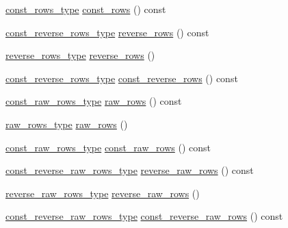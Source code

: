 \begin{DoxyCompactItemize}
\item 
\hyperlink{classIceBRG_1_1labeled__array_a6aec05e454845b2750b446c00fd4c9fb}{const\+\_\+rows\+\_\+type} \hyperlink{classIceBRG_1_1labeled__array_a459e93ba49dd55743341faf01a885668}{const\+\_\+rows} () const 
\item 
\hyperlink{classIceBRG_1_1labeled__array_a4d8f245def66ea4352beb6299a657bfb}{const\+\_\+reverse\+\_\+rows\+\_\+type} \hyperlink{classIceBRG_1_1labeled__array_acc985e5e4129c16f8bedea72a82c6812}{reverse\+\_\+rows} () const 
\item 
\hyperlink{classIceBRG_1_1labeled__array_a24ccb02827e9be94dadbcf647c663b03}{reverse\+\_\+rows\+\_\+type} \hyperlink{classIceBRG_1_1labeled__array_aae7fb0f5a753948803e0a415d6b9fff2}{reverse\+\_\+rows} ()
\item 
\hyperlink{classIceBRG_1_1labeled__array_a4d8f245def66ea4352beb6299a657bfb}{const\+\_\+reverse\+\_\+rows\+\_\+type} \hyperlink{classIceBRG_1_1labeled__array_a789eeeaa20e277ea9d7ff9bfa481c2d4}{const\+\_\+reverse\+\_\+rows} () const 
\item 
\hyperlink{classIceBRG_1_1labeled__array_adecd8b6c6343a2618a1c47c6f15b9ea2}{const\+\_\+raw\+\_\+rows\+\_\+type} \hyperlink{classIceBRG_1_1labeled__array_a6a5bd5901e73694377b61173c6319648}{raw\+\_\+rows} () const 
\item 
\hyperlink{classIceBRG_1_1labeled__array_a87c569635102ad3390845861bc9cf5cc}{raw\+\_\+rows\+\_\+type} \hyperlink{classIceBRG_1_1labeled__array_a54c0925eff34445ac862bc54c90b5875}{raw\+\_\+rows} ()
\item 
\hyperlink{classIceBRG_1_1labeled__array_adecd8b6c6343a2618a1c47c6f15b9ea2}{const\+\_\+raw\+\_\+rows\+\_\+type} \hyperlink{classIceBRG_1_1labeled__array_abded3481bcef303ae5f58aa075c2dcb8}{const\+\_\+raw\+\_\+rows} () const 
\item 
\hyperlink{classIceBRG_1_1labeled__array_a83872d8babf4f2e0db65776cac90aa38}{const\+\_\+reverse\+\_\+raw\+\_\+rows\+\_\+type} \hyperlink{classIceBRG_1_1labeled__array_a07c933d209f4a5a3a212efb971d06e6e}{reverse\+\_\+raw\+\_\+rows} () const 
\item 
\hyperlink{classIceBRG_1_1labeled__array_ae4ef7537f1bfb799048e17588ccd2be0}{reverse\+\_\+raw\+\_\+rows\+\_\+type} \hyperlink{classIceBRG_1_1labeled__array_ad7d8871cdff75a82004c955c24f99862}{reverse\+\_\+raw\+\_\+rows} ()
\item 
\hyperlink{classIceBRG_1_1labeled__array_a83872d8babf4f2e0db65776cac90aa38}{const\+\_\+reverse\+\_\+raw\+\_\+rows\+\_\+type} \hyperlink{classIceBRG_1_1labeled__array_a0431c9effba88adf9dd5af9f7767c89f}{const\+\_\+reverse\+\_\+raw\+\_\+rows} () const 

\end{DoxyCompactItemize}
